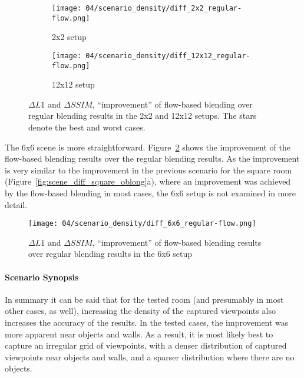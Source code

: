 \begin{figure}
\centering
    \hfill
    \begin{subfigure}[b]{0.4\textwidth}
            \centering
            \texttt{[image: 04/scenario\_density/diff\_2x2\_regular-flow.png]}
            \caption{2x2 setup}
    \end{subfigure}
    \hfill
    \begin{subfigure}[b]{0.4\textwidth}
            \centering
            \texttt{[image: 04/scenario\_density/diff\_12x12\_regular-flow.png]}
            \caption{12x12 setup}
    \end{subfigure}
    \hfill
  \caption[Improvement of flow-based blending results over regular blending results in the 2x2 and 12x12 setups]{$\Delta L1$ and $\Delta SSIM$, ``improvement'' of flow-based blending over regular blending results in the 2x2 and 12x12 setups. The stars denote the best and worst cases.} \label{fig:dens_diff_2x2_12x12}
\end{figure}


The 6x6 scene is more straightforward. Figure~\ref{fig:dens_diff_6x6} shows the improvement of the flow-based blending results over the regular blending results. As the improvement is very similar to the improvement in the previous scenario for the square room (Figure~\ref{fig:scene_diff_square_oblong}a), where an improvement was achieved by the flow-based blending in most cases, the 6x6 setup is not examined in more detail.

\begin{figure}
		\centering
		\texttt{[image: 04/scenario\_density/diff\_6x6\_regular-flow.png]}
		\caption{$\Delta L1$ and $\Delta SSIM$, ``improvement'' of flow-based blending results over regular blending results in the 6x6 setup}
		\label{fig:dens_diff_6x6}
\end{figure}

\paragraph{Scenario Synopsis}
In summary it can be said that for the tested room (and presumably in most other cases, as well), increasing the density of the captured viewpoints also increases the accuracy of the results. In the tested cases, the improvement was more apparent near objects and walls. As a result, it is most likely best to capture an irregular grid of viewpoints, with a denser distribution of captured viewpoints near objects and walls, and a sparser distribution where there are no objects.


